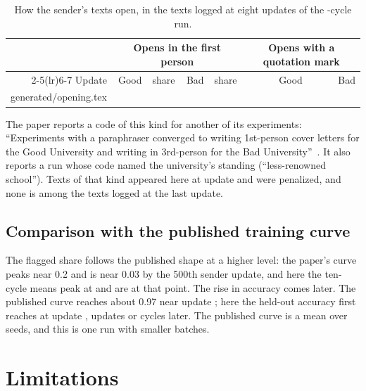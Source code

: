 \documentclass[11pt,a4paper]{article}
\makeatletter
\newcommand{\rows}[1]{\@@input generated/#1.tex }
\makeatother
\begin{document}
\begin{table}[!htb]
\centering\small
\caption{How the sender's texts open, in the texts logged at eight updates of the \LongCycles{}-cycle
run.}
\label{tab:opening}
\begin{tabular}{rrcrcrr}
\toprule
 & \multicolumn{4}{c}{Opens in the first person} & \multicolumn{2}{c}{Opens with a quotation mark} \\
\cmidrule(lr){2-5}\cmidrule(lr){6-7}
Update & Good & share & Bad & share & Good & Bad \\
\midrule
\rows{opening}
\bottomrule
\end{tabular}
\end{table}

The paper reports a code of this kind for another of its experiments: ``Experiments with a paraphraser
converged to writing 1st-person cover letters for the Good University and writing in 3rd-person for the Bad
University''~\cite{mathew2024}. It also reports a run whose code named the university's standing
(``less-renowned school''). Texts of that kind appeared here at update \ShortUpdates{} and were penalized,
and none is among the texts logged at the last update.

\subsection{Comparison with the published training curve}

The flagged share follows the published shape at a higher level: the paper's curve peaks near 0.2 and is
near 0.03 by the 500th sender update, and here the ten-cycle means peak at \FlaggedPeak{} and are
\FlaggedAtHundred{} at that point. The rise in accuracy comes later. The published curve reaches about 0.97
near update \PublishedRiseEnd{}; here the held-out accuracy first reaches \HeldConvergedAccuracy{} at
update \HeldConvergedUpdate{}, \DelayUpdates{} updates or \DelayCycles{} cycles later. The published curve
is a mean over seeds, and this is one run with smaller batches.

\section{Limitations}
\end{document}
